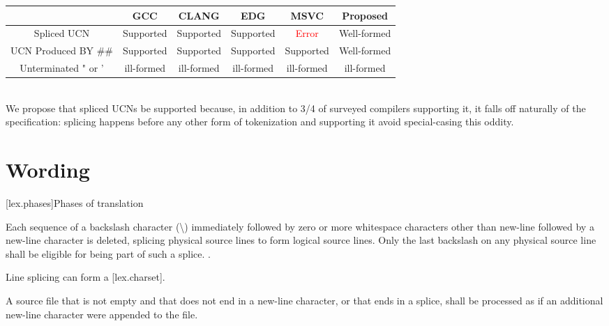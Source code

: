 \documentclass{wg21}
\begin{document}
\renewcommand*\arraystretch{1.4}
\begin{tabular}{|c|c|c|c|c|c|}
     \cline{2-6}
    \multicolumn{1}{c|}{} & GCC & CLANG & EDG & MSVC & Proposed \\
    \hline
    Spliced UCN & Supported & Supported & Supported & \textcolor{red}{Error} & Well-formed \\
    \hline
    UCN Produced BY \#\# & Supported & Supported & Supported & Supported & Well-formed \\
    \hline
    Unterminated " or ' & ill-formed & ill-formed & ill-formed & ill-formed & ill-formed \\
    \hline
\end{tabular}\\

We propose that spliced UCNs be supported because, in addition to 3/4 of surveyed compilers supporting it,
it falls off naturally of the specification: splicing happens before any other form of tokenization and supporting it avoid
special-casing this oddity.

\section{Wording}

[lex.phases]{Phases of translation}

%
Each sequence of a backslash character (\textbackslash)
immediately followed by
zero or more whitespace characters other than new-line followed by
a new-line character is deleted, splicing
physical source lines to form logical source lines. Only the last
backslash on any physical source line shall be eligible for being part
of such a splice.
.

\begin{addedblock}
\begin{note}
Line splicing can form a  [lex.charset].
\end{note}
\end{addedblock}

A source file that is not empty and that does not end in a new-line
character, or that ends in a splice,
shall be processed as if an additional new-line character were appended
to the file.
\end{document}

